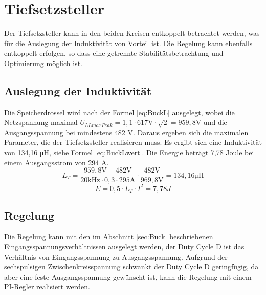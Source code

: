 \section{Tiefsetzsteller}
Der Tiefsetzsteller kann in den beiden Kreisen entkoppelt betrachtet werden, was für die Auslegung der Induktivität von Vorteil ist. Die Regelung kann ebenfalls entkoppelt erfolgen, so dass eine getrennte Stabilitätsbetrachtung und Optimierung möglich ist. 
	\subsection{Auslegung der Induktivität}
	Die Speicherdrossel wird nach der Formel \ref{eq:BuckL} ausgelegt, wobei die Netzspannung maximal $U_{LLmaxPeak}=1,1 \cdot 617 \si{\V} \cdot \sqrt{2}=959,8 \si{\V}$ und die Ausgangsspannung bei mindestens 482 \si{\V}. Daraus ergeben sich die maximalen Parameter, die der Tiefsetzsteller realisieren muss. Es ergibt sich eine Induktivität von 134,16 \si{\micro \henry}, siehe Formel \ref{eq:BuckLwert}. Die Energie beträgt 7,78 Joule bei einem Ausgangsstrom von 294 A. 
	\begin{equation}
	\label{eq:BuckLwert}
	L_{T}=\dfrac{959,8\si{\V} - 482 \si{\V}}{20 \si{\kilo \hertz}\cdot 0,3 \cdot 295 \si{\ampere}}\cdot \dfrac{482 \si{\V}}{969,8 \si{\V}}= 134,16 \si{\micro \henry} 
	\end{equation}
	\begin{equation}
		E=0,5 \cdot L_{T} \cdot I^{2} = 7,78 J
	\end{equation}
	\subsection{Regelung}
	Die Regelung kann mit den im Abschnitt \ref{sec:Buck} beschriebenen Eingangsspannungsverhältnissen ausgelegt werden, der Duty Cycle \gls{D} ist das Verhältnis von Eingangsspannung zu Ausgangsspannung. Aufgrund der sechspulsigen Zwischenkreisspannung schwankt der Duty Cycle \gls{D} geringfügig, da aber eine feste Ausgangsspannung gewünscht ist, kann die Regelung mit einem PI-Regler realisiert werden. 


